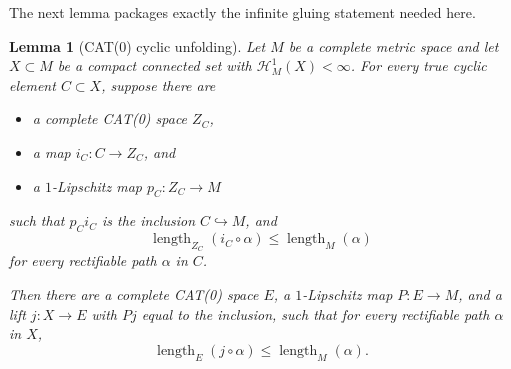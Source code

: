 \documentclass[11pt]{article}
\newtheorem{lemma}[theorem]{Lemma}
\newcommand{\Hh}{\mathcal H}
\newcommand{\len}{\operatorname{length}}
\begin{document}
The next lemma packages exactly the infinite gluing statement needed here.

\begin{lemma}[CAT(0) cyclic unfolding]\label{lem:unfold}
Let $M$ be a complete metric space and let $X\subset M$ be a compact
connected set with $\Hh^1_M(X)<\infty$.  For every true cyclic element
$C\subset X$, suppose there are
\begin{itemize}
\item a complete CAT(0) space $Z_C$,
\item a map $i_C:C\to Z_C$, and
\item a $1$-Lipschitz map $p_C:Z_C\to M$
\end{itemize}
such that $p_Ci_C$ is the inclusion $C\hookrightarrow M$, and
\begin{equation}\label{eq:blocklength}
 \len_{Z_C}(i_C\circ\alpha)\le\len_M(\alpha)
\end{equation}
for every rectifiable path $\alpha$ in $C$.

Then there are a complete CAT(0) space $E$, a $1$-Lipschitz map
$P:E\to M$, and a lift $j:X\to E$ with $Pj$ equal to the inclusion, such that
for every rectifiable path $\alpha$ in $X$,
\begin{equation}\label{eq:globallength}
 \len_E(j\circ\alpha)\le\len_M(\alpha).
\end{equation}
\end{lemma}
\end{document}
